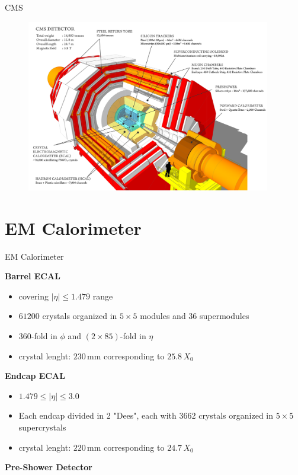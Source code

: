 \documentclass[10pt]{beamer}
\begin{document}
\begin{frame}[fragile]{CMS}
  \begin{figure}
        \centering
        \includegraphics[width=0.95\textwidth]{./img/CMS_scheme.png}
    \end{figure}
\end{frame}


\section{EM Calorimeter}

\begin{frame}[fragile]{EM Calorimeter}

    \textbf{Barrel ECAL}
    \begin{itemize}
        \item  covering $|\eta| \leq 1.479 $ range
        \item $61200$ crystals organized in $5\times5$ modules and $36$ supermodules
        \item $360$-fold in $\phi$ and $(2\times85)$-fold in $\eta$
        \item crystal lenght: $230$\,mm corresponding to $25.8\,X_0$ 
    \end{itemize}
    \textbf{Endcap ECAL} 
    \begin{itemize}
        \item $1.479 \leq |\eta| \leq 3.0 $
        \item Each endcap divided in 2 "Dees", each with 3662 crystals organized in $5\times5$ supercrystals
        \item crystal lenght: $220$\,mm corresponding to $24.7\,X_0$ 
    \end{itemize}
    \textbf{Pre-Shower Detector}
\end{frame}
\end{document}
